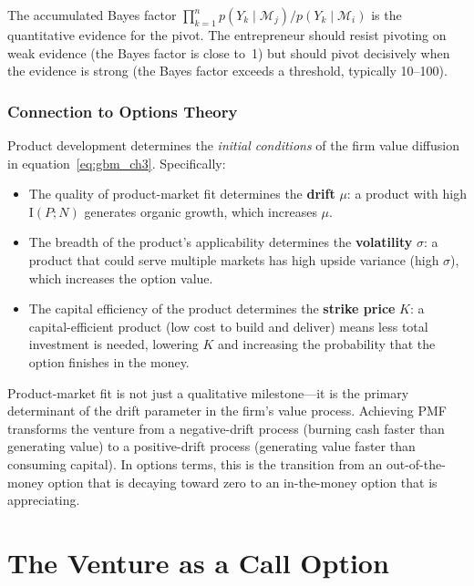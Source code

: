 \documentclass[12pt,a4paper,oneside]{book}
\theoremstyle{definition}
\theoremstyle{remark}
\newcommand{\MI}{\mathrm{I}}
\begin{document}
The accumulated Bayes factor $\prod_{k=1}^n p(Y_k \mid \mathcal{M}_j) / p(Y_k \mid
\mathcal{M}_i)$ is the quantitative evidence for the pivot. The entrepreneur should
resist pivoting on weak evidence (the Bayes factor is close to~1) but should pivot
decisively when the evidence is strong (the Bayes factor exceeds a threshold, typically
10--100).

\subsection{Connection to Options Theory}

Product development determines the \emph{initial conditions} of the firm value
diffusion in equation~\eqref{eq:gbm_ch3}. Specifically:

\begin{itemize}[nosep]
  \item The quality of product-market fit determines the \textbf{drift} $\mu$:
    a product with high $\MI(P; N)$ generates organic growth, which increases $\mu$.
  \item The breadth of the product's applicability determines the \textbf{volatility}
    $\sigma$: a product that could serve multiple markets has high upside variance
    (high $\sigma$), which increases the option value.
  \item The capital efficiency of the product determines the \textbf{strike price} $K$:
    a capital-efficient product (low cost to build and deliver) means less total
    investment is needed, lowering $K$ and increasing the probability that the option
    finishes in the money.
\end{itemize}

\begin{keyinsight}
Product-market fit is not just a qualitative milestone---it is the primary determinant
of the drift parameter in the firm's value process. Achieving PMF transforms the venture
from a negative-drift process (burning cash faster than generating value) to a
positive-drift process (generating value faster than consuming capital). In options
terms, this is the transition from an out-of-the-money option that is decaying toward
zero to an in-the-money option that is appreciating.
\end{keyinsight}

\chapter{The Venture as a Call Option}\label{ch:options}
\end{document}
